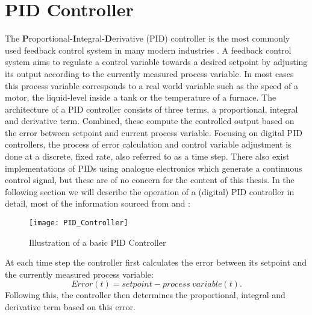 \section{PID Controller}
The \textbf{P}roportional-\textbf{I}ntegral-\textbf{D}erivative (PID) controller is the most commonly used feedback control system in many modern industries \parencite{aastrom2002control}.
A feedback control system aims to regulate a control variable towards a desired setpoint by adjusting its output according to the currently measured process variable.
In most cases this process variable corresponds to a real world variable such as the speed of a motor, the liquid-level inside a tank or the temperature of a furnace.
The architecture of a PID controller consists of three terms, a proportional, integral and derivative term.
Combined, these compute the controlled output based on the error between setpoint and current process variable.
Focusing on digital PID controllers, the process of error calculation and control variable adjustment is done at a discrete, fixed rate, also referred to as a time step.
There also exist implementations of PIDs using analogue electronics which generate a continuous control signal, but these are of no concern for the content of this thesis.
In the following section we will describe the operation of a (digital) PID controller in detail, most of the information sourced from \cite{MATLAB_PID_playlist} and \cite{TLK_Energy_PID_Explanations}:

\begin{figure}[h]
	\centerline{\texttt{[image: PID\_Controller]}}
	\caption[PID controller illustration]{Illustration of a basic PID Controller}
	\label{figure: PID Controller}
\end{figure}


At each time step the controller first calculates the error between its setpoint and the currently measured process variable: 
\[
	Error(t) = setpoint - process\ variable(t)
.\]
Following this, the controller then determines the proportional, integral and derivative term based on this error.

